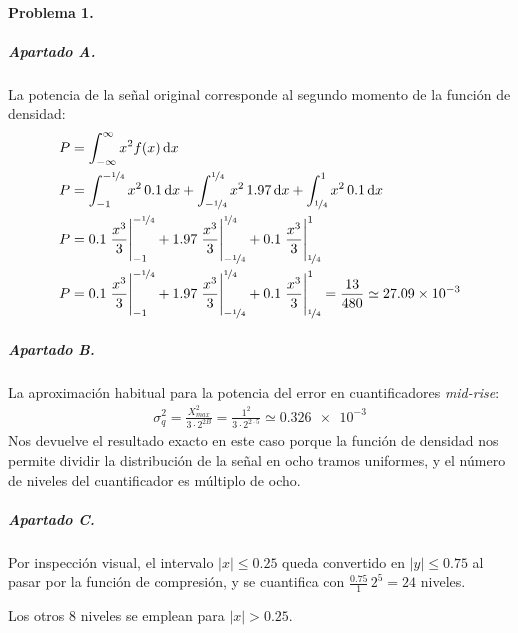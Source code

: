 


\startpage

\paragraph{Problema 1.}

\subparagraph{Apartado A.}

La potencia de la señal original corresponde al segundo momento de la
función de densidad:
%
\begin{align*}
  P &= \int^{\infty}_{-\infty} x^2 f(x) \dif x
\\
  P &=
    \int^{-\nicefrac{1}{4}}_{-1} x^2 \, \num{0.1} \dif x +
    \int^{\nicefrac{1}{4}}_{-\nicefrac{1}{4}} x^2 \, \num{1.97} \dif x +
    \int^{1}_{\nicefrac{1}{4}} x^2 \, \num{0.1} \dif x
\\
  P &=
    \num{0.1} \left. \frac{x^3}{3} \right|^{-\nicefrac{1}{4}}_{-1} +
    \num{1.97} \left. \frac{x^3}{3} \right|^{\nicefrac{1}{4}}_{-\nicefrac{1}{4}} +
    \num{0.1} \left. \frac{x^3}{3} \right|^{1}_{\nicefrac{1}{4}}
\\
  P &=
    \num{0.1} \left. \frac{x^3}{3} \right|^{-\nicefrac{1}{4}}_{-1} +
    \num{1.97} \left. \frac{x^3}{3} \right|^{\nicefrac{1}{4}}_{-\nicefrac{1}{4}} +
    \num{0.1} \left. \frac{x^3}{3} \right|^{1}_{\nicefrac{1}{4}}
    = \frac{13}{480} \simeq \num{27.09e-3}
\end{align*}

\subparagraph{Apartado B.}

La aproximación habitual para la potencia del error en cuantificadores \emph{mid-rise}:
%
\begin{align*}
  \sigma_q^2 = \frac{X_{max}^2}{3 \cdot 2^{2B}}
           = \frac{1^2}{3 \cdot 2^{2 \cdot 5}}
           \simeq \num{0.326e-3}
\end{align*}
%
Nos devuelve el resultado exacto en este caso porque la función de densidad nos
permite dividir la distribución de la señal en ocho tramos uniformes, y el
número de niveles del cuantificador es múltiplo de ocho.

\subparagraph{Apartado C.}

Por inspección visual, el intervalo $\left|x\right| \leq \num{0.25}$ queda
convertido en $\left|y\right| \leq \num{0.75}$ al pasar por la función de
compresión, y se cuantifica con $\frac{\num{0.75}}{1} \, 2^5 = 24$ niveles.

Los otros 8 niveles se emplean para $\left|x\right| > \num{0.25}$.

